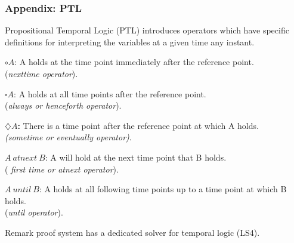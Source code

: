 \documentclass[xcolor=dvipsnames]{beamer}
\begin{document}
\begin{frame}
	\frametitle{Appendix: PTL}
	Propositional Temporal Logic (PTL) introduces operators which have specific definitions for interpreting the variables at a given time any instant.\\
	
	\begin{itemize} \scriptsize{
			\item \textbf{$\circ A$}: A holds at the time point immediately after the reference point.\\ (\textit{nexttime operator}).
			
			\item \textbf{$\square A$}: A holds at all time points after the reference point.\\ (\textit{always or henceforth operator}).
			
			\item \textbf{$\diamondsuit A$:} There is a time point after the reference point at which A holds. \\\textit{(sometime or eventually operator)}. 
			
			\item \textbf{$A\  atnext\  B$}: A will hold at the next time point that B holds. \\( \textit{first time or atnext operator}).
			
			\item \textbf{$A\  until\  B$}: A holds at all following time points up to a  time point at which B holds. \\(\textit{until operator}).}
	\end{itemize}
	
	\begin{block}{Remark}
		\tla proof system has a dedicated solver for temporal logic (LS4).
	\end{block}
\end{frame}
\end{document}
